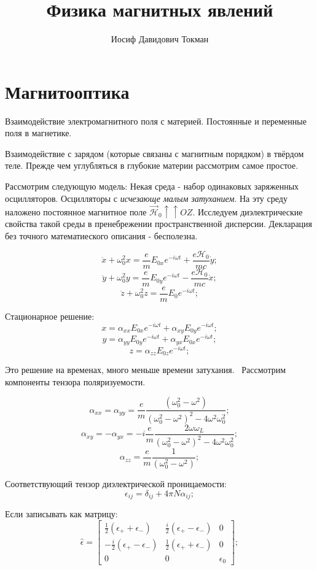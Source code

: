 \documentclass[a4paper, 14pt, russian]{article}
\title{Физика магнитных явлений}
\author{Иосиф Давидович Токман}
\date{}
\newcommand{\be}{\begin{equation}}
\newcommand{\ee}{\end{equation}}
\begin{document}
	\maketitle

	\section{Магнитооптика}

	Взаимодействие электромагнитного поля с материей. Постоянные и переменные
	поля в магнетике. 

	Взаимодействие с зарядом (которые связаны с магнитным порядком) в твёрдом теле. 
	Прежде чем углубляться в глубокие материи рассмотрим самое простое.

	Рассмотрим следующую модель:
	Некая среда - набор одинаковых заряженных осцилляторов. Осцилляторы с 
	\textit{исчезающе малым затуханием}. На эту среду наложено
	постоянное магнитное поле $\vec{\mathcal H}_0 \uparrow\uparrow OZ$.
	Исследуем диэлектрические свойства такой среды 
	в пренебрежении пространственной дисперсии. Декларация без точного
	математиеского описания - бесполезна.

	\be
		\ddot x + \omega_0^2 x = \frac{e}{m} E_{0x} e^{-i\omega t} 
				+ \frac{e{\mathcal H}_0}{mc} \dot y;
	\ee
	\be
		\ddot y + \omega_0^2 y = \frac{e}{m} E_{0y} e^{-i\omega t} 
				- \frac{e{\mathcal H}_0}{mc} \dot x;
	\ee
	\be
		\ddot z + \omega_0^2 z = \frac{e}{m} E_{0} e^{-i\omega t};
	\ee

	Стационарное решение:
	\be
		x = \alpha_{xx} E_{0x} e^{-i\omega t} + \alpha_{xy} E_{0y} e^{-i\omega t};
	\ee
	\be
		y = \alpha_{yy} E_{0y} e^{-i\omega t} + \alpha_{yx} E_{0x} e^{-i\omega t};
	\ee
	\be
		z = \alpha_{zz} E_{0z} e^{-i\omega t};
	\ee

	Это решение на временах, много меньше времени затухания.  Рассмотрим
	компоненты тензора поляризуемости.

	\be
		\alpha_{xx} = \alpha_{yy} = \frac{e}{m} \frac{(\omega_0^2 - \omega^2)}
			{(\omega_0^2 - \omega^2)^2 - 4 \omega^2 \omega_0^2};
	\ee
	\be
		\alpha_{xy} = - \alpha_{yx} = -i\frac{e}{m} \frac{2\omega \omega_L}
			{(\omega_0^2 - \omega^2)^2 - 4 \omega^2 \omega_0^2};
	\ee
	\be
		\alpha_{zz} = \frac{e}{m} \frac{1}{(\omega_0^2 - \omega^2)};
	\ee

	Соответствующий тензор диэлектрической проницаемости:
	\be
		\epsilon_{ij} = \delta_{ij} + 4\pi N \alpha_{ij};
	\ee

	Если записывать как матрицу:
	\be
		\hat{\epsilon} = 
			\begin{bmatrix}
				\frac{1}{2} (\epsilon_+ + \epsilon_-)	& \frac{i}{2} (\epsilon_+ - \epsilon_-)	& 0\\
				-\frac{i}{2} (\epsilon_+ - \epsilon_-)	& \frac{1}{2} (\epsilon_+ + \epsilon_-) & 0\\
				0 & 0 & \epsilon_0
			\end{bmatrix};
	\ee
\end{document}
